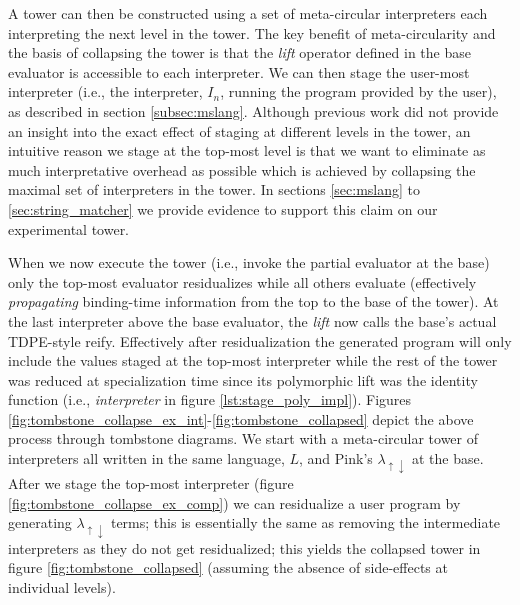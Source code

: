 \documentclass[a4paper,12pt,twoside,openright]{report}
\theoremstyle{definition}
\newcommand{\mslang}{$\lambda_{\uparrow\downarrow}$}
\begin{document}
A tower can then be constructed using a set of meta-circular interpreters each interpreting the next level in the tower. The key benefit of meta-circularity and the basis of collapsing the tower is that the \textit{lift} operator defined in the base evaluator is accessible to each interpreter. We can then stage the user-most interpreter (i.e., the interpreter, $I_n$, running the program provided by the user), as described in section \ref{subsec:mslang}. Although previous work did not provide an insight into the exact effect of staging at different levels in the tower, an intuitive reason we stage at the top-most level is that we want to eliminate as much interpretative overhead as possible which is achieved by collapsing the maximal set of interpreters in the tower. In sections \ref{sec:mslang} to \ref{sec:string_matcher} we provide evidence to support this claim on our experimental tower.

When we now execute the tower (i.e., invoke the partial evaluator at the base) only the top-most evaluator residualizes while all others evaluate (effectively \textit{propagating} binding-time information from the top to the base of the tower). At the last interpreter above the base evaluator, the \textit{lift} now calls the base's actual TDPE-style reify. Effectively after residualization the generated program will only include the values staged at the top-most interpreter while the rest of the tower was reduced at specialization time since its polymorphic lift was the identity function (i.e., \textit{interpreter} in figure \ref{lst:stage_poly_impl}). Figures \ref{fig:tombstone_collapse_ex_int}-\ref{fig:tombstone_collapsed} depict the above process through tombstone diagrams. We start with a meta-circular tower of interpreters all written in the same language, $L$, and Pink's \mslang{} at the base. After we stage the top-most interpreter (figure \ref{fig:tombstone_collapse_ex_comp}) we can residualize a user program by generating \mslang{} terms; this is essentially the same as removing the intermediate interpreters as they do not get residualized; this yields the collapsed tower in figure \ref{fig:tombstone_collapsed} (assuming the absence of side-effects at individual levels).
\end{document}
